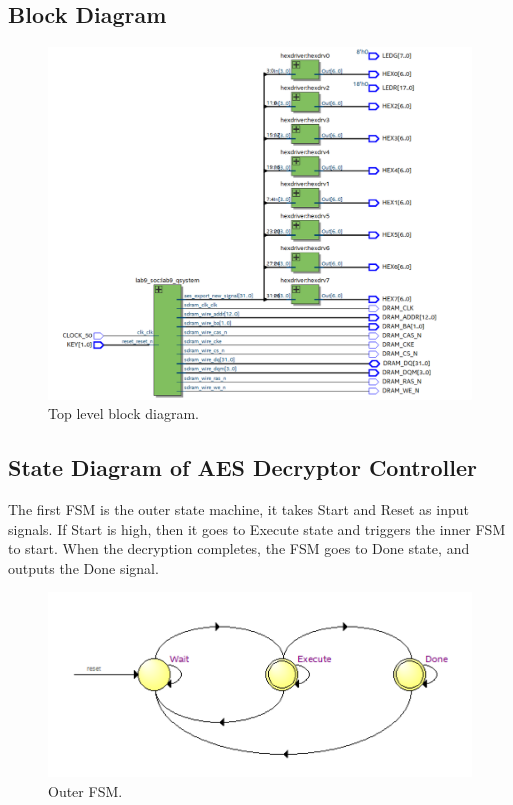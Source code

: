 \documentclass[12pt]{article}
\begin{document}
\subsection{Block Diagram}
\begin{figure}[H]
    \centering
    \includegraphics[width=15cm]{blockdiagram.png}
    \caption{Top level block diagram.}
\end{figure}

\subsection{State Diagram of AES Decryptor Controller}
The first FSM is the outer state machine, it takes Start and Reset as input signals. If Start is high, then it goes to Execute state and triggers the inner FSM to start. When the decryption completes, the FSM goes to Done state, and outputs the Done signal.
\begin{figure}[H]
    \centering
    \includegraphics[width=12cm]{FSM_outer.png}
    \caption{Outer FSM.}
\end{figure}
\end{document}
